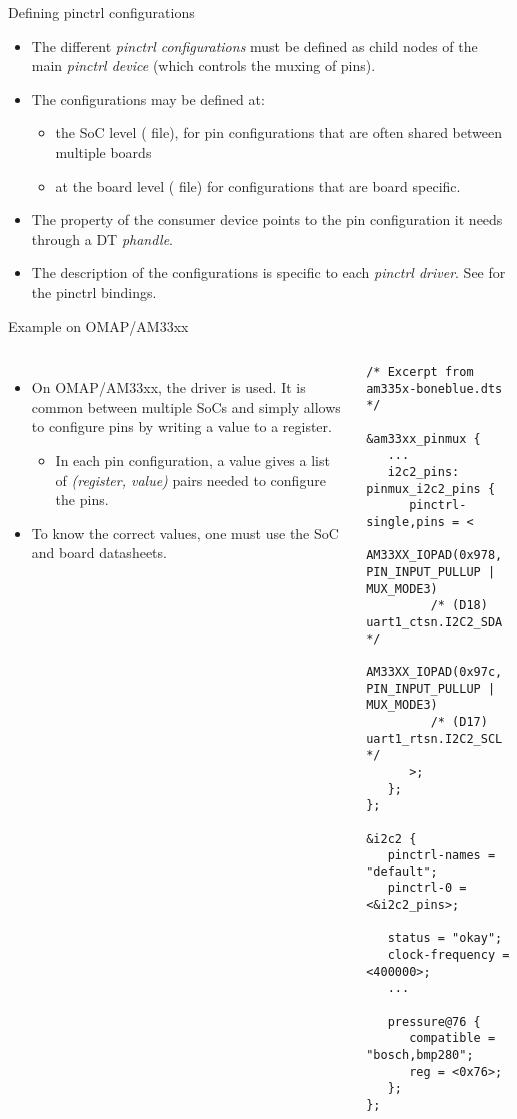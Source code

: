 \begin{frame}{Defining pinctrl configurations}
  \begin{itemize}
  \item The different {\em pinctrl configurations} must be defined as
    child nodes of the main {\em pinctrl device} (which controls the
    muxing of pins).
  \item The configurations may be defined at:
    \begin{itemize}
    \item the SoC level ( file), for pin configurations
      that are often shared between multiple boards
    \item at the board level ( file) for configurations
      that are board specific.
    \end{itemize}
  \item The  property of the consumer device points
    to the pin configuration it needs through a DT {\em phandle}.
  \item The description of the configurations is specific to each {\em
      pinctrl driver}. See
     for the pinctrl bindings.
  \end{itemize}
\end{frame}

\begin{frame}[fragile]{Example on OMAP/AM33xx}
  \begin{columns}
    \begin{itemize}
      \small
    \item On OMAP/AM33xx, the  driver is used. It
      is common between multiple SoCs and simply allows to configure
      pins by writing a value to a register.
      \begin{itemize}
      \item In each pin configuration, a  value
        gives a list of {\em (register, value)} pairs needed to configure
        the pins.
      \end{itemize}
    \item To know the correct values, one must use the SoC and board
      datasheets.
    \end{itemize}
    \begin{verbatim}
/* Excerpt from am335x-boneblue.dts */

&am33xx_pinmux {
   ...
   i2c2_pins: pinmux_i2c2_pins {
      pinctrl-single,pins = <
         AM33XX_IOPAD(0x978, PIN_INPUT_PULLUP | MUX_MODE3)
         /* (D18) uart1_ctsn.I2C2_SDA */
         AM33XX_IOPAD(0x97c, PIN_INPUT_PULLUP | MUX_MODE3)
         /* (D17) uart1_rtsn.I2C2_SCL */
      >;
   };
};

&i2c2 {
   pinctrl-names = "default";
   pinctrl-0 = <&i2c2_pins>;

   status = "okay";
   clock-frequency = <400000>;
   ...

   pressure@76 {
      compatible = "bosch,bmp280";
      reg = <0x76>;
   };
};
    \end{verbatim}
  \end{columns}
\end{frame}

